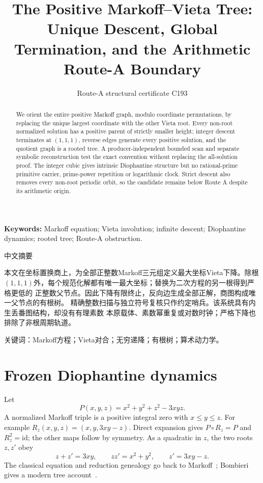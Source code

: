 \documentclass[9pt]{extarticle}
\title{The Positive Markoff--Vieta Tree:\\
Unique Descent, Global Termination, and the Arithmetic Route-A Boundary}
\author{Route-A structural certificate C193}
\date{}
\begin{document}
\maketitle
\begin{abstract}
We orient the entire positive Markoff graph, modulo coordinate permutations,
by replacing the unique largest coordinate with the other Vieta root.  Every
non-root normalized solution has a positive parent of strictly smaller height;
integer descent terminates at $(1,1,1)$, reverse edges generate every positive
solution, and the quotient graph is a rooted tree.  A producer-independent
bounded scan and separate symbolic reconstruction test the exact convention
without replacing the all-solution proof.  The integer cubic gives intrinsic
Diophantine structure but no rational-prime primitive carrier, prime-power
repetition or logarithmic clock.  Strict descent also removes every non-root
periodic orbit, so the candidate remains below Route A despite its arithmetic
origin.
\end{abstract}
\noindent\textbf{Keywords:} Markoff equation; Vieta involution; infinite
descent; Diophantine dynamics; rooted tree; Route-A obstruction.

\begin{otherlanguage}{chinese-simplified}
\begin{center}{\large 中文摘要}\end{center}
本文在坐标置换商上，为全部正整数\foreignlanguage{english}{Markoff}三元组定义最大坐标\foreignlanguage{english}{Vieta}下降。除根
$(1,1,1)$外，每个规范化解都有唯一最大坐标；替换为二次方程的另一根得到严格更低的
正整数父节点。因此下降有限终止，反向边生成全部正解，商图构成唯一父节点的有根树。
精确整数扫描与独立符号复核只作约定哨兵。该系统具有内生丢番图结构，却没有有理素数
本原载体、素数幂重复或对数时钟；严格下降也排除了非根周期轨道。

\noindent 关键词：\foreignlanguage{english}{Markoff}方程；\foreignlanguage{english}{Vieta}对合；无穷递降；有根树；算术动力学。
\end{otherlanguage}

\section{Frozen Diophantine dynamics}
Let
\[
 P(x,y,z)=x^2+y^2+z^2-3xyz.
\]
A normalized Markoff triple is a positive integral zero with $x\le y\le z$.
For example $R_z(x,y,z)=(x,y,3xy-z)$.  Direct expansion gives
$P\circ R_z=P$ and $R_z^2=\mathrm{id}$; the other maps follow by symmetry.
As a quadratic in $z$, the two roots $z,z'$ obey
\begin{equation}\label{eq:vieta}
 z+z'=3xy,\qquad zz'=x^2+y^2,\qquad z'=3xy-z.
\end{equation}
The classical equation and reduction genealogy go back to
Markoff~\cite{M79}; Bombieri gives a modern tree account~\cite{B07}.
\end{document}
